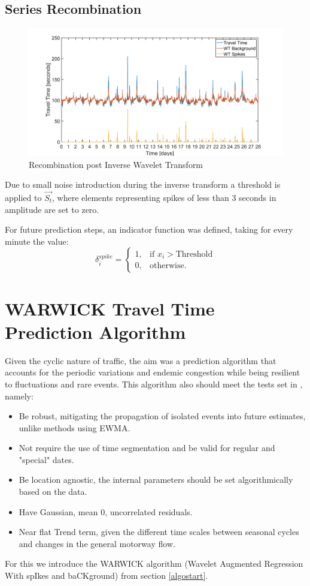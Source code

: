 \documentclass[a4paper, 10pt, conference]{ieeeconf}      %
\begin{document}
\subsection{Series Recombination}
\begin{figure}[htbp]
	\centerline{\includegraphics[width=\linewidth]{./images/Splitting.png}}
	\caption{Recombination post Inverse Wavelet Transform}
	\label{fig:splitting}
\end{figure}

Due to small noise introduction during the inverse transform a threshold is applied to $\vec{S_t}$, where elements representing spikes of less than 3 seconds in amplitude are set to zero.

For future prediction steps, an indicator function was defined, taking for every minute the value:
\begin{equation}
    \delta_i^{spike}=
    \begin{cases}
      1, & \text{if } x_i > \text{Threshold}\\
      0, & \text{otherwise.}
    \end{cases}
    \label{delta}
  \end{equation}
  


\section{WARWICK Travel Time Prediction Algorithm} \label{algorithm}
Given the cyclic nature of traffic, the aim was a prediction algorithm that accounts for the periodic variations and endemic congestion while being resilient to fluctuations and rare events. This algorithm also should meet the tests set in \cite{ttprofiles}, namely:
\begin{itemize}
	\item Be robust, mitigating the propagation of isolated events into future estimates, unlike methods using EWMA.
	\item Not require the use of time segmentation and be valid for regular and "special" dates.
	\item Be location agnostic, the internal parameters should be set algorithmically based on the data.
	\item Have Gaussian, mean 0, uncorrelated residuals.
	\item Near flat Trend term, given the different time scales between seasonal cycles and changes in the general motorway flow.
\end{itemize}
For this we introduce the WARWICK algorithm (Wavelet Augmented Regression With spIkes and baCKground) from section \ref{algostart}.
\end{document}
